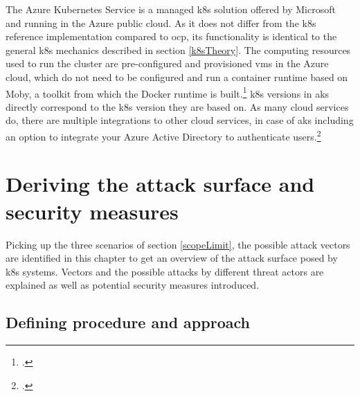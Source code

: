 The Azure Kubernetes Service is a managed \gls{k8s} solution offered by Microsoft and running in the Azure public cloud. 
As it does not differ from the \gls{k8s} reference implementation compared to \gls{ocp}, its functionality is identical to the general \gls{k8s} mechanics described in section \ref{k8sTheory}.
The computing resources used to run the cluster are pre-configured and provisioned \gls{vm}s in the Azure cloud, which do not need to be configured and run a container runtime based on Moby, a toolkit from which the Docker runtime is built.\footcite[][, section 'What is Moby?']{dockerMoby} 
\gls{k8s} versions in \gls{aks} directly correspond to the \gls{k8s} version they are based on.
As many cloud services do, there are multiple integrations to other cloud services, in case of \gls{aks} including an option to integrate your Azure Active Directory to authenticate users.\footcite[][, first paragraph]{aadAksAuth}


\chapter{Deriving the attack surface and security measures}

Picking up the three scenarios of section \ref{scopeLimit}, the possible attack vectors are  identified in this chapter to get an overview of the attack surface posed by \gls{k8s} systems. Vectors and the possible attacks by different threat actors are explained as well as potential security measures introduced.

\section{Defining procedure and approach}


